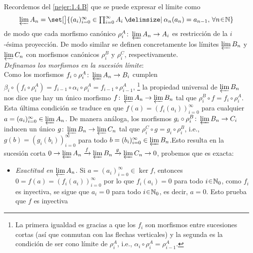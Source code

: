 \begin{sol}
Recordemos del \cref{nejer:1.4.B} que se puede expresar el límite como 
\[
\varprojlim A_n =\set[\big]{ \textstyle (a_i)^\infty_{i=0} \in \prod^\infty_{i=0} A_i \given \alpha_{n}(a_n) = a_{n-1},\, \forall n \en \mathbb{N} }
\]
de modo que cada morfismo canónico $\rho^A_i\colon\varprojlim A_n \to A_i$ es restricción de la $i$-ésima proyección. De modo similar se definen concretamente los límites $\varprojlim B_n$ y $\varprojlim C_n$ con morfismos canónicos $\rho^B_i$ y $\rho^C_i$, respectivamente.\medskip\\
\emph{Definamos los morfismos en la sucesión límite}:\\
Como los morfismos $f_i \circ \rho^A_i \colon \varprojlim A_n \to B_i$ cumplen $\beta_i \circ (f_i \circ \rho^A_i) = f_{i-1} \circ \alpha_i \circ \rho^A_i = f_{i-1} \circ \rho^A_{i-1}$,%
\footnote{
    La primera igualdad es gracias a que los $f_i$ son morfismos entre sucesiones cortas (así que conmutan con las flechas verticales) y la segunda es la condición de ser cono límite de $\rho^A_i$, i.e., $\alpha_i \circ \rho^A_i = \rho^A_{i-1}$.
}
la propiedad universal de $\varprojlim B_n$ nos dice que hay un único morfismo $f \colon \varprojlim A_n \to \varprojlim B_n$ tal que $\rho^B_i \circ f = f_i \circ \rho^A_i$. Esta última condición se traduce en que $f(a) = (f_i(a_i))^\infty_{i=0}$ para cualquier $a=(a_i)^\infty_{i=0} \in \varprojlim A_n$. De manera análoga, los morfismos $g_i \circ \rho^B_i \colon \varprojlim B_n \to C_i$ inducen un único $g \colon \varprojlim B_n \to \varprojlim C_n$ tal que $\rho^C_i \circ g=g_i \circ \rho^B_i$, i.e., $g(b) = (g_i(b_i))^\infty_{i=0}$ para todo $b=(b_i)^\infty_{i=0} \in \varprojlim B_n$.\pagebreak[3]
Esto resulta en la sucesión corta $0 \to \varprojlim A_n \xrightarrow{f} \varprojlim B_n \xrightarrow{g} \varprojlim C_n \to 0$,
probemos que es exacta:
\begin{itemize}
\item\emph{Exactitud en $\varprojlim A_n$}. 
Si $a=(a_i)^\infty_{i=0}\in\ker f$, entonces $0=f(a) = (f_i(a_i))^\infty_{i=0}$ por lo que $f_i(a_i) = 0$ para todo $i\en\mathbb{N}_0$, como $f_i$ es inyectiva, se sigue que $a_i=0$ para todo $i\en\mathbb{N}_0$, es decir, $a=0$. Esto prueba que $f$ es inyectiva


\end{itemize}
\end{sol}
